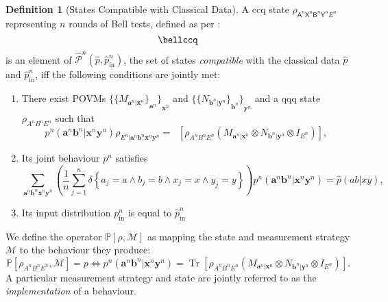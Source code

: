 \documentclass[10pt, a4paper]{article}
\numberwithin{equation}{section} %
\newcounter{stmt} %
\theoremstyle{definition}
\newtheorem{defn}[stmt]{Definition}
\theoremstyle{plain}
\newcommand{\?}{\mathrel{?}} %
\newcommand{\cvec}[1]{\boldsymbol{\mathbf{#1}}}    %
\newcommand{\indic}[1]{\delta{\left\{#1\right\}}} %
\newcommand{\Tr}[2][]{\mathop{\mathrm{Tr}#1}\left[ #2 \right]} %
\newcommand{\sM}{\mathcal{M}}
\newcommand{\crv}[1]{\mathsf{#1}}
\newcommand{\compatstates}[3][]{\hat{\mathcal{P}}#1(#2,#3)}
\newcommand{\prin}[1][p]{#1_{\mathrm{in}}}
\newcommand{\behav}[2]{\mathbb{P}\left[#1, #2\right]}
\begin{document}
    \begin{defn}[States Compatible with Classical Data]
    A ccq state \(\rho_{\crv{A}^n\crv{X}^n \crv{B}^n\crv{Y}^n E^n}\) representing \(n\) rounds of Bell tests, defined as per :
    \begin{equation}
      \bellccq
    \end{equation}
  is an element of \(\compatstates[^n]{\hat{p}}{\prin[\hat{p}^n]}\), the set of states \emph{compatible} with the classical data \(\hat{p}\) and \(\prin[\hat{p}^n]\), iff the following conditions are jointly met:
      \begin{enumerate}
        \item There exist POVMs \({\{ {\{ M_{\cvec{a}^n|\cvec{x}^n}\}}_{\cvec{a}^n} \}}_{\cvec{x}^n}\) and \({\{ {\{ N_{\cvec{b}^n|\cvec{y}^n}\}}_{\cvec{b}^n} \}}_{\cvec{y}^n}\) and a qqq state \(\rho_{A^n B^n E^n}\) such that
        \begin{equation}\label{eqn:probmeas}
          p^n(\cvec{a}^n\cvec{b}^n|\cvec{x}^n\cvec{y}^n) \rho_{E^n|\cvec{a}^n\cvec{b}^n \cvec{x}^n\cvec{y}^n} = \Tr[_{A^n B^n}]{\rho_{A^n B^n E^n} \left(M_{\cvec{a}^n|\cvec{x}^n} \otimes N_{\cvec{b}^n|\cvec{y}^n} \otimes I_{E^n}\right) },
        \end{equation}
        \item Its joint behaviour \(p^n\) satisfies
      \begin{equation}
        \sum_{\cvec{a}^n\cvec{b}^n \cvec{x}^n\cvec{y}^n} \left( \frac{1}{n} \sum_{j=1}^n \indic{a_j = a \land b_j = b \land x_j = x \land y_j = y} \right) p^n(\cvec{a}^n\cvec{b}^n|\cvec{x}^n\cvec{y}^n) = \hat{p}(ab|xy),
      \end{equation}
      \item Its input distribution \(\prin^n\) is equal to \(\prin[\hat{p}^n]\)
  \end{enumerate}
    \end{defn}

    We define the operator \(\behav{\rho}{\sM}\) as mapping the state and measurement strategy \(\sM\) to the behaviour they produce:
    \begin{equation}
      \behav{\rho_{A^n B^n E^n}}{\sM} = p \Leftrightarrow p^n(\cvec{a}^n\cvec{b}^n|\cvec{x}^n\cvec{y}^n) = \Tr{\rho_{A^n B^n E^n} \left(M_{\cvec{a}^n|\cvec{x}^n} \otimes N_{\cvec{b}^n|\cvec{y}^n} \otimes I_{E^n}\right) }.
    \end{equation}
    A particular measurement strategy and state are jointly referred to as the \emph{implementation} of a behaviour.
\end{document}
